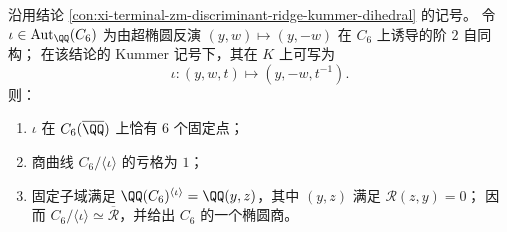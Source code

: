 \begin{conclusion}[二面体提升反射的固定点与椭圆商：\texorpdfstring{$\#\mathrm{Fix}(\iota)=6$}{\#Fix(iota)=6} 与亏格 \(1\)]\label{con:xi-terminal-zm-discriminant-ridge-dihedral-fixedpoints-elliptic-quotient}
沿用结论 \ref{con:xi-terminal-zm-discriminant-ridge-kummer-dihedral} 的记号。
令 \(\iota\in\operatorname{Aut}_{\QQ}(C_6)\) 为由超椭圆反演 \((y,w)\mapsto(y,-w)\) 在 \(C_6\) 上诱导的阶 \(2\) 自同构；
在该结论的 Kummer 记号下，其在 \(K\) 上可写为
\[
\iota:(y,w,t)\longmapsto(y,-w,t^{-1}).
\]
则：
\begin{enumerate}
  \item \(\iota\) 在 \(C_{6}(\overline{\QQ})\) 上恰有 \(6\) 个固定点；
  \item 商曲线 \(C_{6}/\langle\iota\rangle\) 的亏格为 \(1\)；
  \item 固定子域满足 \(\QQ(C_{6})^{\langle\iota\rangle}=\QQ(y,z)\)，其中 \((y,z)\) 满足 \(\mathscr R(z,y)=0\)；
  因而 \(C_{6}/\langle\iota\rangle\simeq\overline{\mathcal R}\)，并给出 \(C_6\) 的一个椭圆商。
\end{enumerate}
\end{conclusion}
